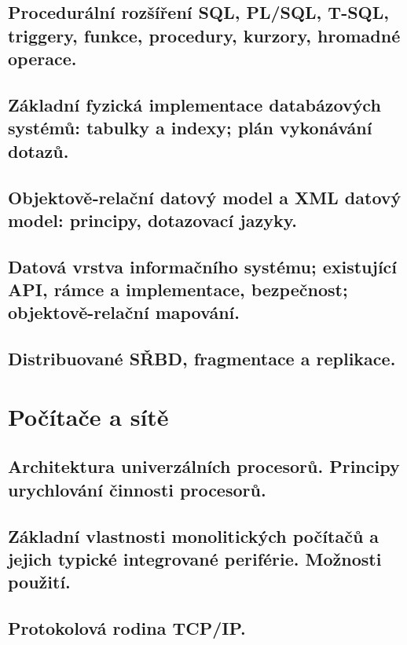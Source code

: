 \documentclass[openany]{book}
\begin{document}
\chapter{Procedurální rozšíření SQL, PL/SQL, T-SQL, triggery, funkce, procedury, kurzory, hromadné operace.}


\chapter{Základní fyzická implementace databázových systémů: tabulky a indexy; plán vykonávání dotazů.}


\chapter{Objektově‐relační datový model a XML datový model: principy, dotazovací jazyky.}


\chapter{Datová vrstva informačního systému; existující API, rámce a implementace, bezpečnost; objektově-relační mapování.}


\chapter{Distribuované SŘBD, fragmentace a replikace.}


\part{Počítače a sítě}
\chapter{Architektura univerzálních procesorů. Principy urychlování činnosti procesorů. }


\chapter{Základní vlastnosti monolitických počítačů a jejich typické integrované periférie. Možnosti použití. }


\chapter{Protokolová rodina TCP/IP. }

\end{document}
